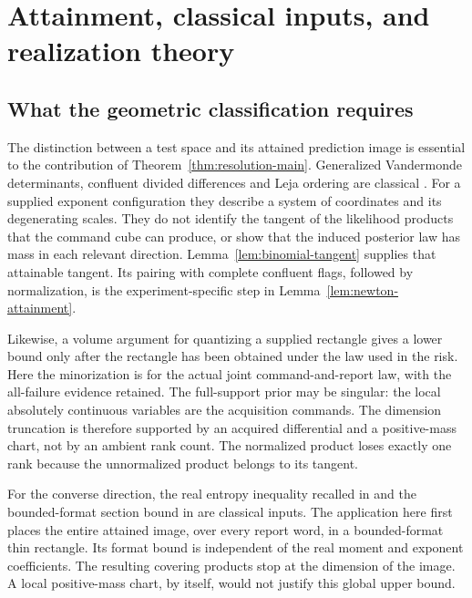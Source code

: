 \section{Attainment, classical inputs, and realization theory}
\label{sec:v33-comparison}

\subsection{What the geometric classification requires}
The distinction between a test space and its attained prediction image
is essential to the contribution of Theorem~\ref{thm:resolution-main}.
Generalized Vandermonde determinants, confluent divided differences and
Leja ordering are classical \cite{Pinkus,deBoor,Leja,BosEtAl}. For a
supplied exponent configuration they describe a system of coordinates
and its degenerating scales. They do not identify the tangent of the
likelihood products that the command cube can produce, or show that
the induced posterior law has mass in each relevant direction.
Lemma~\ref{lem:binomial-tangent} supplies that attainable tangent.
Its pairing with complete confluent flags, followed by normalization,
is the experiment-specific step in Lemma~\ref{lem:newton-attainment}.

Likewise, a volume argument for quantizing a supplied rectangle gives
a lower bound only after the rectangle has been obtained under the
law used in the risk. Here the minorization is for the actual joint
command-and-report law, with the all-failure evidence retained.
The full-support prior may be singular: the local absolutely continuous
variables are the acquisition commands. The dimension truncation is
therefore supported by an acquired differential and a positive-mass
chart, not by an ambient rank count. The normalized product loses
exactly one rank because the unnormalized product belongs to its tangent.

For the converse direction, the real entropy inequality recalled in
\cite{YomdinComte,ComteHalupczok} and the bounded-format section bound
in \cite[Lemma 2.18]{ZhangKileel} are classical inputs. The application
here first places the entire attained image, over every report word,
in a bounded-format thin rectangle. Its format bound is independent
of the real moment and exponent coefficients. The resulting covering
products stop at the dimension of the image. A local positive-mass
chart, by itself, would not justify this global upper bound.

